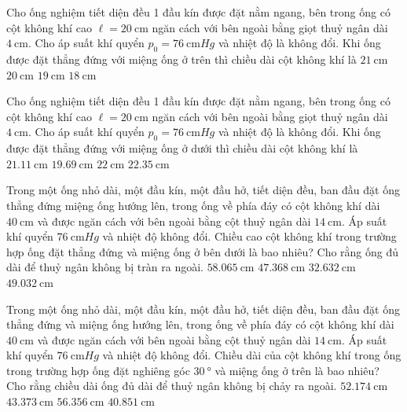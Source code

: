 \begin{ex}
Cho ống nghiệm tiết diện đều 1 đầu kín được đặt nằm ngang, bên trong ống có cột không khí cao $\ell=\SI{20}{\centi\meter}$ ngăn cách với bên ngoài bằng giọt thuỷ ngân dài $\SI{4}{\centi\meter}$. Cho áp suất khí quyển $p_0=\SI{76}{\centi\meter Hg}$ và nhiệt độ là không đổi. Khi ống được đặt thẳng đứng với miệng ống ở trên thì chiều dài cột không khí là	
	\choice
	{$\SI{21}{\centi\meter}$}
	{$\SI{20}{\centi\meter}$}
	{\True $\SI{19}{\centi\meter}$}
	{$\SI{18}{\centi\meter}$}
\end{ex}
\begin{ex}
Cho ống nghiệm tiết diện đều 1 đầu kín được đặt nằm ngang, bên trong ống có cột không khí cao $\ell=\SI{20}{\centi\meter}$ ngăn cách với bên ngoài bằng giọt thuỷ ngân dài $\SI{4}{\centi\meter}$. Cho áp suất khí quyển $p_0=\SI{76}{\centi\meter Hg}$ và nhiệt độ là không đổi. Khi ống được đặt thẳng đứng với miệng ống ở dưới thì chiều dài cột không khí là	
	\choice
	{\True $\SI{21.11}{\centi\meter}$}
	{$\SI{19.69}{\centi\meter}$}
	{$\SI{22}{\centi\meter}$}
	{$\SI{22.35}{\centi\meter}$}
\end{ex}
\begin{ex}
Trong một ống nhỏ dài, một đầu kín, một đầu hở, tiết diện đều, ban đầu đặt ống thẳng đứng miệng ống hướng lên, trong ống về phía đáy có cột không khí dài $\SI{40}{\centi\meter}$ và được ngăn cách với bên ngoài bằng cột thuỷ ngân dài $\SI{14}{\centi\meter}$. Áp suất khí quyển $\SI{76}{\centi\meter Hg}$ và nhiệt độ không đổi. Chiều cao cột không khí trong trường hợp ống đặt thẳng đứng và miệng ống ở bên dưới là bao nhiêu? Cho rằng ống đủ dài để thuỷ ngân không bị tràn ra ngoài.	
	\choice
	{\True $\SI{58.065}{\centi\meter}$}
	{$\SI{47.368}{\centi\meter}$}
	{$\SI{32.632}{\centi\meter}$}
	{$\SI{49.032}{\centi\meter}$}
\end{ex}
\begin{ex}
Trong một ống nhỏ dài, một đầu kín, một đầu hở, tiết diện đều, ban đầu đặt ống thẳng đứng và miệng ống hướng lên, trong ống về phía đáy có cột không khí dài $\SI{40}{\centi\meter}$ và được ngăn cách với bên ngoài bằng cột thuỷ ngân dài $\SI{14}{\centi\meter}$. Áp suất khí quyển $\SI{76}{\centi\meter Hg}$ và nhiệt độ không đổi. Chiều dài của cột không khí trong ống trong trường hợp ống đặt nghiêng góc $\SI{30}{\degree}$ và miệng ống ở trên là bao nhiêu? Cho rằng chiều dài ống đủ dài để thuỷ ngân không bị chảy ra ngoài.	
	\choice
	{$\SI{52.174}{\centi\meter}$}
	{\True $\SI{43.373}{\centi\meter}$}
	{$\SI{56.356}{\centi\meter}$}
	{$\SI{40.851}{\centi\meter}$}
\end{ex}
